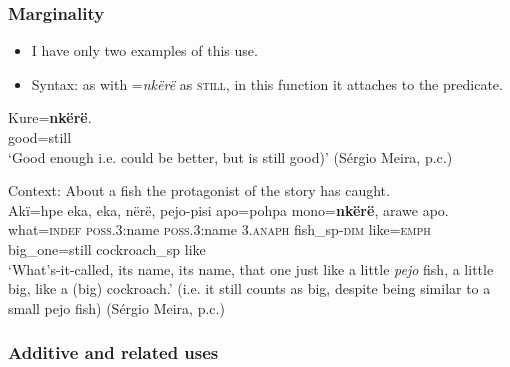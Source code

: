 \subsubsection{Marginality}
\label{appendixTrioMarginal}
\begin{itemize}
	\item I have only two examples of this use.
	\item Syntax: as with \mbox{=\textit{nkërë}} as \textsc{still}, in this function it attaches to the predicate.
\end{itemize}

\begin{exe}
	
	\ex\label{exAppendixTrioMarginal1}
	\gll Kure=\textbf{nkërë}.\\
	good=still\\
	\glt \lq Good enough i.e. could be better, but is still good)\rq{ }(Sérgio Meira, p.c.)
	
	\ex\label{exAppendixTrioMarginal2}
	Context: About a fish the protagonist of the story has caught.\\
	\gll Akï=hpe eka, eka, nërë, pejo-pisi apo=pohpa mono=\textbf{nkërë}, arawe apo.\\
	what=\textsc{indef} \textsc{poss}.3:name \textsc{poss}.3:name 3.\textsc{anaph} fish\_sp-\textsc{dim} like=\textsc{emph} big\_one=still cockroach\_sp like\\
	\glt \lq What's-it-called, its name, its name, that one just like a little \textit{pejo} fish, a little big, like a (big) cockroach.' (i.e. it still counts as big, despite being similar to a small pejo fish) (Sérgio Meira, p.c.)
\end{exe}

\pagebreak\largerpage[2]
\subsubsection{Additive and related uses}
